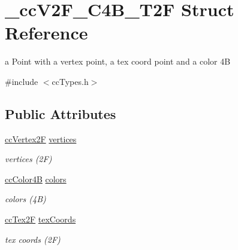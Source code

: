 \hypertarget{struct__cc_v2_f___c4_b___t2_f}{\section{\-\_\-cc\-V2\-F\-\_\-\-C4\-B\-\_\-\-T2\-F Struct Reference}
\label{struct__cc_v2_f___c4_b___t2_f}
}


a Point with a vertex point, a tex coord point and a color 4\-B  




{\ttfamily \#include $<$cc\-Types.\-h$>$}

\subsection*{Public Attributes}
\begin{DoxyCompactItemize}
\item 
\hypertarget{struct__cc_v2_f___c4_b___t2_f_a033690712a48f59dd281bd5aefbe0581}{\hyperlink{cc_types_8h_a3d0a9a02a1f9787a9ede91b9a74bf41f}{cc\-Vertex2\-F} \hyperlink{struct__cc_v2_f___c4_b___t2_f_a033690712a48f59dd281bd5aefbe0581}{vertices}}\label{struct__cc_v2_f___c4_b___t2_f_a033690712a48f59dd281bd5aefbe0581}

\begin{DoxyCompactList}\small\item\em vertices (2\-F) \end{DoxyCompactList}\item 
\hypertarget{struct__cc_v2_f___c4_b___t2_f_aff6f33b2ff19b9596f9c58291494648d}{\hyperlink{cc_types_8h_a2f83e39e0378b79d089014c140169793}{cc\-Color4\-B} \hyperlink{struct__cc_v2_f___c4_b___t2_f_aff6f33b2ff19b9596f9c58291494648d}{colors}}\label{struct__cc_v2_f___c4_b___t2_f_aff6f33b2ff19b9596f9c58291494648d}

\begin{DoxyCompactList}\small\item\em colors (4\-B) \end{DoxyCompactList}\item 
\hypertarget{struct__cc_v2_f___c4_b___t2_f_ab1f493fa0956291276cf0ee07b189fd8}{\hyperlink{cc_types_8h_a95226f1345c203215cc1f419aafe47c5}{cc\-Tex2\-F} \hyperlink{struct__cc_v2_f___c4_b___t2_f_ab1f493fa0956291276cf0ee07b189fd8}{tex\-Coords}}\label{struct__cc_v2_f___c4_b___t2_f_ab1f493fa0956291276cf0ee07b189fd8}

\begin{DoxyCompactList}\small\item\em tex coords (2\-F) \end{DoxyCompactList}\end{DoxyCompactItemize}


